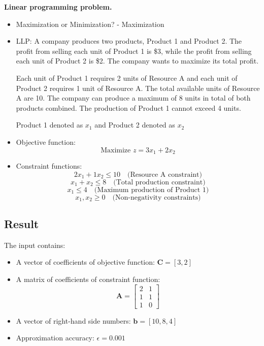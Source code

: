 \documentclass[12pt, legalpaper]{exam}
\begin{document}
\noindent  \textbf{Linear programming problem.}
\begin{itemize}
\item Maximization or Minimization? - Maximization
\vspace{10pt}
    \item  LLP:
    A company produces two products, Product 1 and Product 2. The profit from selling each unit of Product 1 is \$3, while the profit from selling each unit of Product 2 is \$2. The company wants to maximize its total profit.

Each unit of Product 1 requires 2 units of Resource A and each unit of Product 2 requires 1 unit of Resource A. The total available units of Resource A are 10. The company can produce a maximum of 8 units in total of both products combined. The production of Product 1 cannot exceed 4 units.

Product 1 denoted as \( x_1 \) and Product 2 denoted as \( x_2 \)
    \item Objective function:
    \[
  \text{Maximize } z = 3x_1 + 2x_2
  \]
    \vspace{10pt}    
    \item Constraint functions:
    \[
  2x_1 + 1x_2 \leq 10 \quad \text{(Resource A constraint)}
  \]
  \[
  x_1 + x_2 \leq 8 \quad \text{(Total production constraint)}
  \]
  \[
  x_1 \leq 4 \quad \text{(Maximum production of Product 1)}
  \]
  \[
  x_1, x_2 \geq 0 \quad \text{(Non-negativity constraints)}
  \]
\end{itemize}


\subsection*{Result}
The input contains:
\begin{itemize}
    \item A vector of coefficients of objective function: $\mathbf{C} = [3, 2]$
    \item A matrix of coefficients of constraint function:
    \[
    \mathbf{A} =
    \begin{bmatrix}
    2 & 1 \\
    1 & 1 \\
    1 & 0
    \end{bmatrix}
    \]
    \item A vector of right-hand side numbers: $\mathbf{b} = [10, 8, 4]$
    \item Approximation accuracy: $\epsilon = 0.001$
\end{itemize}
\end{document}
